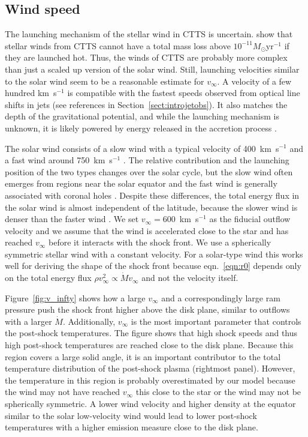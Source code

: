 \subsection{Wind speed}
The launching mechanism of the stellar wind in CTTS is uncertain. \citet{2007IAUS..243..299M} show that stellar winds from CTTS cannot have a total mass loss above $10^{-11}M_\odot\mathrm{ yr}^{-1}$ if they are launched hot. 
Thus, the winds of CTTS are probably more complex than just a scaled up version of the solar wind.
Still, launching velocities similar to the solar wind seem to be a reasonable estimate for $v_\infty$. A velocity of a few hundred km~s$^{-1}$ is compatible with the fastest speeds observed from optical line shifts in jets (see references in Section~\ref{sect:introjetobs}). It also matches the depth of the gravitational potential, and while the launching mechanism is unknown, it is likely powered by energy released in the accretion process \citep{1988ApJ...332L..41K,2005ApJ...632L.135M}.

The solar wind consists of a slow wind with a typical velocity of 400~km~s$^{-1}$ and a fast wind around 750~km~s$^{-1}$ \citep{2005JGRA..110.7109F}. The relative contribution and the launching position of the two types changes over the solar cycle, but the slow wind often emerges from regions near the solar equator and the fast wind is generally associated with coronal holes \citep{1999GeoRL..26.2901G,2003A&A...408.1165B,2009LRSP....6....3C}. Despite these differences, the total energy flux in the solar wind is almost independent of the latitude, because the slower wind is denser than the faster wind \citep{2012SoPh..279..197L}. We set $v_\infty=600$~km~s$^{-1}$ as the fiducial outflow velocity and we assume that the wind is accelerated close to the star and has reached $v_\infty$ before it interacts with the shock front. We use a spherically symmetric stellar wind with a constant velocity. For a solar-type wind this works well for deriving the shape of the shock front because eqn.~\ref{eqn:r0} depends only on the total energy flux $\rho v^2_\infty \propto \dot M v_\infty$ and not the velocity itself. 

Figure~\ref{fig:v_infty} shows how a large $v_\infty$ and a correspondingly large ram pressure push the shock front higher above the disk plane, similar to outflows with a larger $\dot M$. Additionally, $v_\infty$ is the most important parameter that controls the post-shock temperatures.
The figure shows that high shock speeds and thus high post-shock temperatures are reached close to the disk plane. Because this region covers a large solid angle, it is an important contributor to the total temperature distribution of the post-shock plasma (rightmost panel). However, the temperature in this region is probably overestimated by our model because the wind may not have reached $v_\infty$ this close to the star or the wind may not be spherically symmetric. A lower wind velocity and higher density at the equator similar to the solar low-velocity wind would lead to lower post-shock temperatures with a higher emission measure close to the disk plane.
